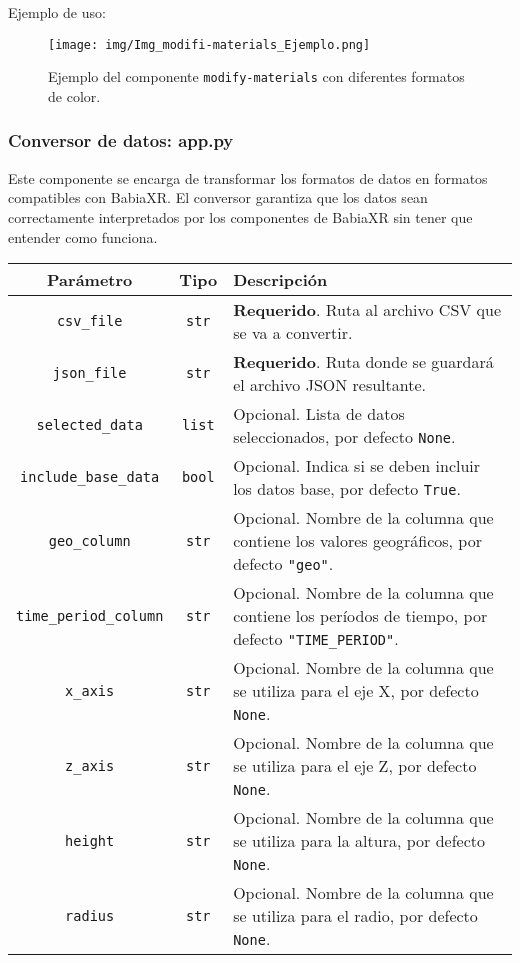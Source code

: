 \documentclass[a4paper, 12pt]{book}
\begin{document}
\vspace{1em} 
Ejemplo de uso:
\begin{figure}[H]
    \centering
\texttt{[image: img/Img\_modifi-materials\_Ejemplo.png]}
    \caption{\footnotesize Ejemplo del componente \texttt{modify-materials} con diferentes formatos de color.}
    \label{fig:Img_modifi-materials_Ejemplo}
\end{figure}

\newpage
\subsubsection*{Conversor de datos: app.py}

Este componente se encarga de transformar los formatos de datos en formatos compatibles con BabiaXR. El conversor garantiza que los datos sean correctamente interpretados por los componentes de BabiaXR sin tener que entender como funciona.

\vspace{1em}

\begin{tabular}{|c|c|p{8cm}|}
\hline
\textbf{Parámetro} & \textbf{Tipo} & \textbf{Descripción} \\
\hline
\texttt{csv\_file} & \texttt{str} & \textbf{Requerido}. Ruta al archivo CSV que se va a convertir. \\
\hline
\texttt{json\_file} & \texttt{str} & \textbf{Requerido}. Ruta donde se guardará el archivo JSON resultante. \\
\hline
\texttt{selected\_data} & \texttt{list} & Opcional. Lista de datos seleccionados, por defecto \texttt{None}. \\
\hline
\texttt{include\_base\_data} & \texttt{bool} & Opcional. Indica si se deben incluir los datos base, por defecto \texttt{True}. \\
\hline
\texttt{geo\_column} & \texttt{str} & Opcional. Nombre de la columna que contiene los valores geográficos, por defecto \texttt{"geo"}. \\
\hline
\texttt{time\_period\_column} & \texttt{str} & Opcional. Nombre de la columna que contiene los períodos de tiempo, por defecto \texttt{"TIME\_PERIOD"}. \\
\hline
\texttt{x\_axis} & \texttt{str} & Opcional. Nombre de la columna que se utiliza para el eje X, por defecto \texttt{None}. \\
\hline
\texttt{z\_axis} & \texttt{str} & Opcional. Nombre de la columna que se utiliza para el eje Z, por defecto \texttt{None}. \\
\hline
\texttt{height} & \texttt{str} & Opcional. Nombre de la columna que se utiliza para la altura, por defecto \texttt{None}. \\
\hline
\texttt{radius} & \texttt{str} & Opcional. Nombre de la columna que se utiliza para el radio, por defecto \texttt{None}. \\
\hline
\end{tabular}
\end{document}
